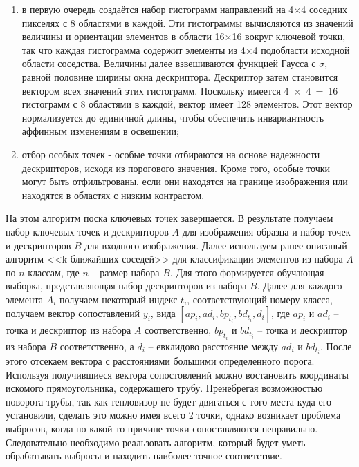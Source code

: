 \documentclass[14pt, a4paper]{extreport}
\begin{document}
\begin{enumerate}[label={\arabic*)}]
	\item в первую очередь создаётся набор гистограмм направлений на 4×4 соседних пикселях с 8 областями в каждой. Эти гистограммы вычисляются из значений величины и ориентации элементов в области 16×16 вокруг ключевой точки, так что каждая гистограмма содержит элементы из 4×4 подобласти исходной области соседства. Величины далее взвешиваются функцией Гаусса с $\sigma$, равной половине ширины окна дескриптора. Дескриптор затем становится вектором всех значений этих гистограмм. Поскольку имеется 4~×~4~=~16 гистограмм с 8 областями в каждой, вектор имеет 128 элементов. Этот вектор нормализуется до единичной длины, чтобы обеспечить инвариантность аффинным изменениям в освещении;
	
	\item отбор особых точек - особые точки отбираются на основе надежности дескрипторов, исходя из порогового значения. Кроме того, особые точки могут быть отфильтрованы, если они находятся на границе изображения или находятся в областях с низким контрастом.
	\end{enumerate}

	На этом алгоритм поска ключевых точек завершается. 
	В результате получаем набор ключевых точек и дескрипторов $A$ для изображения образца и набор точек и дескрипторов $B$ для входного изображения. Далее используем ранее описаный алгоритм <<k ближайших соседей>> для классификации элементов из набора $A$ по $n$ классам, где $n$ -- размер набора $B$. Для этого формируется обучающая выборка, представляющая набор дескрипторов из набора $B$. Далее для каждого элемента $A_i$ получаем некоторый индекс $t_i$, соответствующий номеру класса, получаем вектор сопоставлений $y_i$, вида $[ap_i, ad_i, bp_{t_i}, bd_{t_i}, d_i]$, где $ap_i$ и $ad_i$ -- точка и дескриптор из набора $A$ соответственно, $bp_{t_i}$ и $bd_{t_i}$ -- 
	точка и дескриптор из набора $B$ соответственно, а $d_i$ -- евклидово расстояние между $ad_i$ и $bd_{t_i}$. После этого отсекаем вектора с расстояниями большими определенного порога.
	Используя получившиеся вектора сопостовлений можно востановить координаты искомого прямоугольника, содержащего трубу. Пренебрегая возможностью поворота трубы, так как тепловизор не будет двигаться с того места куда его установили, сделать это можно имея всего 2 точки, однако возникает проблема выбросов, когда по какой то причине точки сопоставляются неправильно. Следовательно необходимо реальзовать алгоритм, который будет уметь обрабатывать выбросы и находить наиболее точное соответствие.
	
\end{document}
